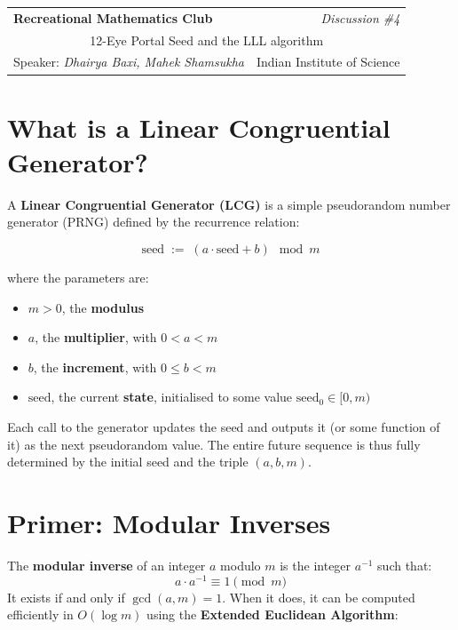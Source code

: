\documentclass[11pt]{article}
\theoremstyle{plain}
\theoremstyle{definition}
\begin{document}
\noindent
\begin{tabular}{|p{} r|}
\hline
\textbf{Recreational Mathematics Club} & \textit{Discussion \#4} \\[4pt]
\multicolumn{2}{|c|}{\Large 12-Eye Portal Seed and the LLL algorithm} \\[4pt]
Speaker: \textit{Dhairya Baxi, Mahek Shamsukha} & Indian Institute of Science \\
\hline
\end{tabular}


\section{What is a Linear Congruential Generator?}

A \textbf{Linear Congruential Generator (LCG)} is a simple pseudorandom number generator (PRNG)
defined by the recurrence relation:

\[
    \text{seed} \;:=\; (a \cdot \text{seed} + b) \mod m
\]

where the parameters are:
\begin{itemize}
    \item $m > 0$, the \textbf{modulus}
    \item $a$, the \textbf{multiplier}, with $0 < a < m$
    \item $b$, the \textbf{increment}, with $0 \leq b < m$
    \item $\text{seed}$, the current \textbf{state}, initialised to some value $\text{seed}_0 \in [0, m)$
\end{itemize}

Each call to the generator updates the seed and outputs it (or some function of it) as the next
pseudorandom value. The entire future sequence is thus fully determined by the initial seed and
the triple $(a, b, m)$.

\section{Primer: Modular Inverses}

The \textbf{modular inverse} of an integer $a$ modulo $m$ is the integer $a^{-1}$ such that:
\[
    a \cdot a^{-1} \equiv 1 \pmod{m}
\]
It exists if and only if $\gcd(a, m) = 1$. When it does, it can be computed efficiently in
$O(\log m)$ using the \textbf{Extended Euclidean Algorithm}:
\end{document}
